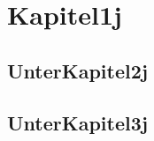 \chapter{Kapitel1j}
\label{sec:Kapitel1j}

\section{UnterKapitel2j}
\label{sec:UnterKapitel2j}

\section{UnterKapitel3j}
\label{sec:UnterKapitel3j}